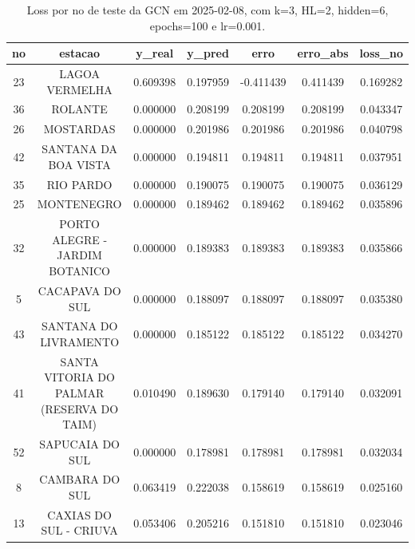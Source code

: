 \begin{table}[h]
\centering
\caption{Loss por no de teste da GCN em 2025-02-08, com k=3, HL=2, hidden=6, epochs=100 e lr=0.001.}
\label{tab:gcn_loss_k3_hl2_h6_e100_d20250208}
\begin{tabular}{ccccccc}
\toprule
no & estacao & y\_real & y\_pred & erro & erro\_abs & loss\_no \\
\midrule
23 & LAGOA VERMELHA & 0.609398 & 0.197959 & -0.411439 & 0.411439 & 0.169282 \\
36 & ROLANTE & 0.000000 & 0.208199 & 0.208199 & 0.208199 & 0.043347 \\
26 & MOSTARDAS & 0.000000 & 0.201986 & 0.201986 & 0.201986 & 0.040798 \\
42 & SANTANA DA BOA VISTA & 0.000000 & 0.194811 & 0.194811 & 0.194811 & 0.037951 \\
35 & RIO PARDO & 0.000000 & 0.190075 & 0.190075 & 0.190075 & 0.036129 \\
25 & MONTENEGRO & 0.000000 & 0.189462 & 0.189462 & 0.189462 & 0.035896 \\
32 & PORTO ALEGRE - JARDIM BOTANICO & 0.000000 & 0.189383 & 0.189383 & 0.189383 & 0.035866 \\
5 & CACAPAVA DO SUL & 0.000000 & 0.188097 & 0.188097 & 0.188097 & 0.035380 \\
43 & SANTANA DO LIVRAMENTO & 0.000000 & 0.185122 & 0.185122 & 0.185122 & 0.034270 \\
41 & SANTA VITORIA DO PALMAR (RESERVA DO TAIM) & 0.010490 & 0.189630 & 0.179140 & 0.179140 & 0.032091 \\
52 & SAPUCAIA DO SUL & 0.000000 & 0.178981 & 0.178981 & 0.178981 & 0.032034 \\
8 & CAMBARA DO SUL & 0.063419 & 0.222038 & 0.158619 & 0.158619 & 0.025160 \\
13 & CAXIAS DO SUL - CRIUVA & 0.053406 & 0.205216 & 0.151810 & 0.151810 & 0.023046 \\
\bottomrule
\end{tabular}
\end{table}
